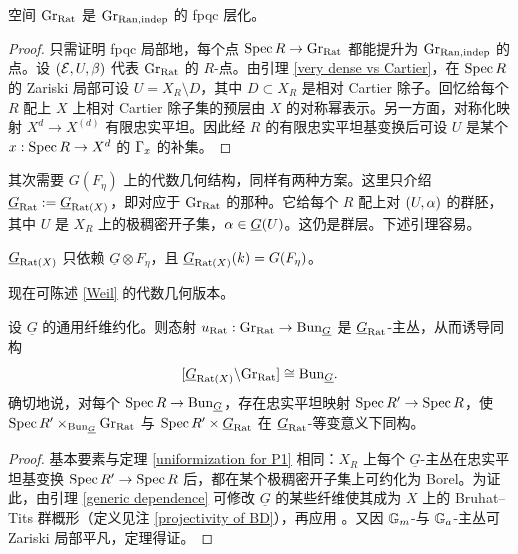 \begin{lem}\label{sheafify Ran}
空间 ${\operatorname{Gr}}_{\operatorname{Rat}}$ 是 ${\operatorname{Gr}}_{\operatorname{Ran},\operatorname{indep}}$ 的 fpqc 层化。
\end{lem}

\begin{proof}
只需证明 fpqc 局部地，每个点 $\operatorname{Spec} R\to {\operatorname{Gr}}_{\operatorname{Rat}}$ 都能提升为 ${\operatorname{Gr}}_{\operatorname{Ran},\operatorname{indep}}$ 的点。设 $({\mathcal E},U, \beta)$ 代表 ${\operatorname{Gr}}_{\operatorname{Rat}}$ 的 $R$-点。由引理 \ref{very dense vs Cartier}，在 $\operatorname{Spec} R$ 的 Zariski 局部可设 $U=X_R\setminus D$，其中 $D\subset X_R$ 是相对 Cartier 除子。回忆给每个 $R$ 配上 $X$ 上相对 Cartier 除子集的预层由 $X$ 的对称幂表示。另一方面，对称化映射 $X^d\to X^{(d)}$ 有限忠实平坦。因此经 $R$ 的有限忠实平坦基变换后可设 $U$ 是某个 $x:\operatorname{Spec} R\to X^d$ 的 ${\Gamma}_x$ 的补集。
\end{proof}

其次需要 $G(F_\eta)$ 上的代数几何结构，同样有两种方案。这里只介绍 ${\underline G}_{\operatorname{Rat}}:={\underline G}_{\operatorname{Rat}(X)}$，即对应于 ${\operatorname{Gr}}_{\operatorname{Rat}}$ 的那种。它给每个 $R$ 配上对 $(U,{\alpha})$ 的群胚，其中 $U$ 是 $X_R$ 上的极稠密开子集，${\alpha}\in \underline G(U)$。这仍是群层。下述引理容易。

\begin{lem}\label{generic dependence}
${\underline G}_{\operatorname{Rat}(X)}$ 只依赖 $\underline G\otimes F_\eta$，且 ${\underline G}_{\operatorname{Rat}(X)}(k)=G(F_\eta)$。
\end{lem}

现在可陈述 \eqref{Weil} 的代数几何版本。

\begin{thm}\label{ran uniformization of BunG}
设 $\underline G$ 的通用纤维约化。则态射 $u_{\operatorname{Rat}}:{\operatorname{Gr}}_{\operatorname{Rat}}\to{\operatorname{Bun}}_{\underline G}$ 是 ${\underline G}_{\operatorname{Rat}}$-主丛，从而诱导同构
\[[{\underline G}_{\operatorname{Rat}(X)}\backslash {\operatorname{Gr}}_{\operatorname{Rat}}]\cong {\operatorname{Bun}}_{\underline G}.\]
确切地说，对每个 $\operatorname{Spec} R\to {\operatorname{Bun}}_{\underline G}$，存在忠实平坦映射 $\operatorname{Spec} R'\to \operatorname{Spec} R$，使 $\operatorname{Spec} R'\times_{{\operatorname{Bun}}_{\underline G}}{\operatorname{Gr}}_{\operatorname{Rat}}$ 与 $\operatorname{Spec} R'\times {\underline G}_{\operatorname{Rat}}$ 在 ${\underline G}_{\operatorname{Rat}}$-等变意义下同构。
\end{thm}

\begin{proof}
基本要素与定理 \ref{uniformization for P1} 相同：$X_R$ 上每个 $\underline G$-主丛在忠实平坦基变换 $\operatorname{Spec} R'\to\operatorname{Spec} R$ 后，都在某个极稠密开子集上可约化为 Borel。为证此，由引理 \ref{generic dependence} 可修改 $\underline G$ 的某些纤维使其成为 $X$ 上的 Bruhat--Tits 群概形（定义见注 \ref{projectivity of BD}），再应用 \cite[Corollary 26]{He}。又因 ${\mathbb G}_m$-与 ${\mathbb G}_a$-主丛可 Zariski 局部平凡，定理得证。
\end{proof}

